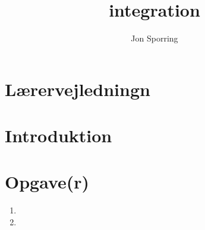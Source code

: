 \documentclass[a4paper,12pt]{article}
\title{integration}
\author{Jon Sporring}
\begin{document}
\maketitle

\section{Lærervejledningn}

\section{Introduktion}

\section{Opgave(r)}
\begin{enumerate}
\item 
\item 
\end{enumerate}
\end{document}

